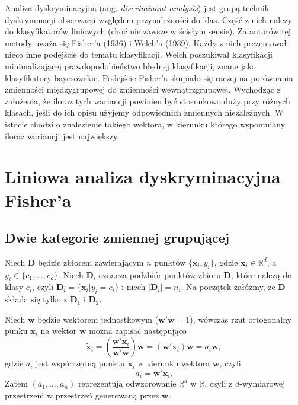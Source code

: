 \documentclass[]{book}
\theoremstyle{plain}
\theoremstyle{definition}
\theoremstyle{definition}
\theoremstyle{definition}
\theoremstyle{definition}
\theoremstyle{remark}
\begin{document}
Analiza dyskryminacyjna (ang. \emph{discriminant analysis}) jest grupą technik dyskryminacji obserwacji względem przynależności do klas. Część z nich należy do klasyfikatorów liniowych (choć nie zawsze w ścisłym sensie). Za autorów tej metody uważa się Fisher'a (\protect\hyperlink{ref-fisher1936}{1936}) i Welch'a (\protect\hyperlink{ref-welch1939}{1939}). Każdy z nich prezentował nieco inne podejście do tematu klasyfikacji. Welch poszukiwał klasyfikacji minimalizującej prawdopodobieństwo błędnej klasyfikacji, znane jako \protect\hyperlink{bayes}{klasyfikatory bayesowskie}. Podejście Fisher'a skupiało się raczej na porównaniu zmienności międzygrupowej do zmienności wewnątrzgrupowej. Wychodząc z założenia, że iloraz tych wariancji powinien być stosunkowo duży przy różnych klasach, jeśli do ich opisu użyjemy odpowiednich zmiennych niezależnych. W istocie chodzi o znalezienie takiego wektora, w kierunku którego wspomniany iloraz wariancji jest największy.

\hypertarget{liniowa-analiza-dyskryminacyjna-fishera}{%
\section{Liniowa analiza dyskryminacyjna Fisher'a}\label{liniowa-analiza-dyskryminacyjna-fishera}}

\hypertarget{dwie-kategorie-zmiennej-grupujacej}{%
\subsection{Dwie kategorie zmiennej grupującej}\label{dwie-kategorie-zmiennej-grupujacej}}

Niech \(\boldsymbol D\) będzie zbiorem zawierającym \(n\) punktów \(\{\boldsymbol x_i, y_i\}\), gdzie \(\boldsymbol x_i\in \mathbb{R}^d\), a \(y_i\in \{c_1,\ldots,c_k\}\). Niech \(\boldsymbol D_i\) oznacza podzbiór punktów zbioru \(\boldsymbol D\), które należą do klasy \(c_i\), czyli \(\boldsymbol D_i=\{\boldsymbol x_i|y_i=c_i\}\) i niech \(|\boldsymbol D_i|=n_i\). Na początek załóżmy, że \(\boldsymbol D\) składa się tylko z \(\boldsymbol D_1\) i \(\boldsymbol D_2\).

Niech \(\boldsymbol w\) będzie wektorem jednostkowym (\(\boldsymbol w'\boldsymbol w=1\)), wówczas rzut ortogonalny punku \(\boldsymbol x_i\) na wektor \(\boldsymbol w\) można zapisać następująco
\begin{equation}
    \tilde{\boldsymbol x}_i=\left(\frac{\boldsymbol w'\boldsymbol x_i}{\boldsymbol w'\boldsymbol w}\right)\boldsymbol w=(\boldsymbol w'\boldsymbol x_i)\boldsymbol w = a_i\boldsymbol w,
\end{equation}
gdzie \(a_i\) jest współrzędną punktu \(\tilde{\boldsymbol x}_i\) w kierunku wektora \(\boldsymbol w\), czyli
\begin{equation}
    a_i=\boldsymbol w'\boldsymbol x_i.
\end{equation}
Zatem \((a_1,\ldots,a_n)\) reprezentują odwzorowanie \(\mathbb{R}^d\) w \(\mathbb{R}\), czyli z \(d\)-wymiarowej przestrzeni w przestrzeń generowaną przez \(\boldsymbol w\).
\end{document}
